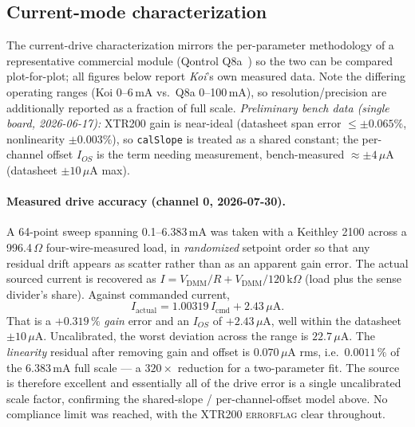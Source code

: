 \documentclass[11pt]{article}
\begin{document}
\subsection{Current-mode characterization}
\label{sec:current-char}
The current-drive characterization mirrors the per-parameter methodology of a
representative commercial module (Qontrol Q8a~\cite{qontrol_q8a}) so the two can
be compared plot-for-plot; all figures below report \emph{Koi}'s own measured
data. Note the differing operating ranges (Koi 0--6\,mA vs.\ Q8a 0--100\,mA), so
resolution/precision are additionally reported as a fraction of full scale.
\emph{Preliminary bench data (single board, 2026-06-17):} XTR200 gain is
near-ideal (datasheet span error $\le \pm0.065\%$, nonlinearity $\pm0.003\%$),
so \texttt{calSlope} is treated as a shared constant; the per-channel offset
$I_{OS}$ is the term needing measurement, bench-measured $\approx\pm4\,\mu$A
(datasheet $\pm10\,\mu$A max).

\paragraph{Measured drive accuracy (channel 0, 2026-07-30).} A 64-point sweep
spanning 0.1--6.383\,mA was taken with a Keithley 2100 across a
996.4\,$\Omega$ four-wire-measured load, in \emph{randomized} setpoint order so
that any residual drift appears as scatter rather than as an apparent gain
error. The actual sourced current is recovered as
$I=V_\text{DMM}/R + V_\text{DMM}/120\,\text{k}\Omega$ (load plus the sense
divider's share). Against commanded current,
\[
  I_\text{actual} = 1.00319\,I_\text{cmd} + 2.43\,\mu\text{A}.
\]
That is a $+0.319\,\%$ \emph{gain} error and an $I_{OS}$ of $+2.43\,\mu$A, well
within the datasheet $\pm10\,\mu$A. Uncalibrated, the worst deviation across the
range is $22.7\,\mu$A. The \emph{linearity} residual after removing gain and
offset is $0.070\,\mu$A rms, i.e.\ $0.0011\,\%$ of the 6.383\,mA full scale ---
a $320\times$ reduction for a two-parameter fit. The source is therefore
excellent and essentially all of the drive error is a single uncalibrated scale
factor, confirming the shared-slope / per-channel-offset model above. No
compliance limit was reached, with the XTR200 \textsc{errorflag} clear
throughout.
\end{document}

